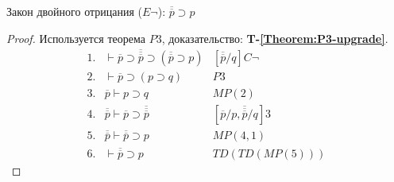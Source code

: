 \begin{propthm}\label{Theorem:Elnot}
    Закон двойного отрицания ($E\lnot$): $\overline{\overline{p}} \supset p$
\end{propthm}
\begin{proof}
    Используется теорема $P3$, доказательство: \textbf{T-\ref{Theorem:P3-upgrade}}.
    \begin{equation*}
        \begin{array}{lll}
            1. & \vdash \overline{p} \supset \overline{\overline{\overline{p}}} \supset (\overline{\overline{p}} \supset p) & [\overline{\overline{p}}/q]C\lnot \\
            2. & \vdash \overline{p} \supset (p \supset q) & P3 \\
            3. & \overline{p} \vdash p \supset q & MP(2) \\
            4. & \overline{\overline{p}} \vdash \overline{p} \supset \overline{\overline{\overline{p}}} & [\overline{p}/p, \overline{\overline{\overline{p}}}/q]3 \\
            5. & \overline{\overline{p}} \vdash \overline{\overline{p}} \supset p & MP(4,1) \\
            6. & \vdash \overline{\overline{p}} \supset p & TD(TD(MP(5)))
        \end{array}
    \end{equation*}
\end{proof}

